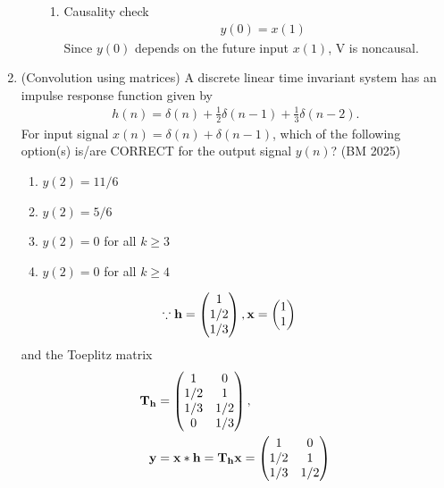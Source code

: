 \begin{enumerate}[label=\thesubsection.\arabic*,ref=\thesubsection.\theenumi]
\begin{enumerate}
\begin{enumerate}
\item Causality check
\begin{align}
\quad y(0) = x(1)
\end{align}
Since $y(0)$ depends on the future input $x(1)$, V is noncausal.
\end{enumerate}
\end{enumerate}
\item (Convolution using matrices) A discrete linear time invariant system has an impulse response function given by
\begin{align}
h(n) = \delta(n) + \frac{1}{2}\delta(n-1) + \frac{1}{3}\delta(n-2).
\end{align}
For input signal $x(n) = \delta(n) + \delta(n-1)$, which of the following option(s) is/are CORRECT for the output signal $y(n)$?
\hfill  (BM 2025)
\begin{multicols}{4}
\begin{enumerate}
\setlength{\itemsep}{0pt}
    \item $y(2) = 11/6$
    \item $y(2) = 5/6$
    \item $y(2) = 0$ for all $k \ge 3$
    \item $y(2) = 0$ for all $k \ge 4$
\end{enumerate}
\end{multicols}
\solution
\begin{align}
\because	\mathbf{h}&=\begin{pmatrix}1 \\ 1/2 \\ 1/3\end{pmatrix},
	\mathbf{x}=\begin{pmatrix}1 \\ 1\end{pmatrix}
\end{align}
and the Toeplitz matrix 
\begin{align}
\mathbf{T}_\mathbf{h}&=\begin{pmatrix} 
    1 & 0 \\ 
    1/2 & 1 \\
    1/3 & 1/2 \\
    0 & 1/3 
    \end{pmatrix},
    \\
    \mathbf{y} &= \mathbf{x}*\mathbf{h}=\mathbf{T}_\mathbf{h}\mathbf{x}
	    =	\begin{pmatrix}
	1 & 0 \\
	1/2 & 1 \\
	1/3 & 1/2 \\
\end{pmatrix}
\end{align}
\end{enumerate}
